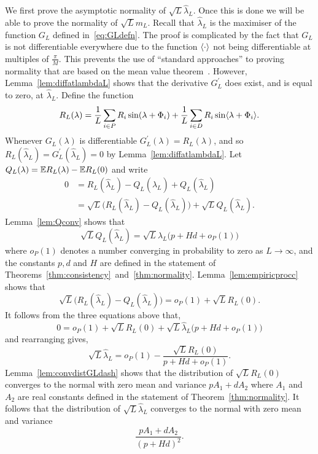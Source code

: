 \documentclass[journal]{IEEEtran}
\begin{document}
We first prove the asymptotic normality of $\sqrt{L} \hat{\lambda}_L$.  Once this is done we will be able to prove the normality of $\sqrt{L} m_L$.  Recall that $\hat{\lambda}_L$ is the maximiser of the function $G_L$ defined in~\eqref{eq:GLdefn}.  The proof is complicated by the fact that $G_L$ is not differentiable everywhere due to the function $\left\langle \cdot \right\rangle$ not being differentiable at multiples of $\tfrac{\pi}{M}$.  This prevents the use of ``standard approaches'' to proving normality that are based on the mean value theorem~\cite{vonMises_diff_stats_1947,vanDerVart1971_asymptotic_stats,Pollard_new_ways_clts_1986,Pollard_conv_stat_proc_1984,Pollard_asymp_empi_proc_1989,van2009empirical}.  However, Lemma~\ref{lem:diffatlambdaL} shows that the derivative $G_L^\prime$ does exist, and is equal to zero, at $\hat{\lambda}_L$. Define the function
\begin{equation}\label{eq:RLdef}
R_L(\lambda) = \frac{1}{L} \sum_{i \in P} R_i \sin(\lambda + \Phi_i) + \frac{1}{L} \sum_{i \in D} R_i \sin\langle \lambda + \Phi_i \rangle.
\end{equation}
Whenever $G_L(\lambda)$ is differentiable $G_L^\prime(\lambda) = R_L(\lambda)$, and so $R_L(\hat{\lambda}_L) = G_L^\prime(\hat{\lambda}_L) = 0$ by Lemma~\ref{lem:diffatlambdaL}.  Let $Q_L(\lambda) = {\mathbb E} R_L(\lambda) - {\mathbb E} R_L(0)$ and write
\begin{align*}
0 &= R_L(\hat{\lambda}_L) - Q_L(\hat{\lambda}_L) + Q_L(\hat{\lambda}_L) \\
&= \sqrt{L}\big( R_L(\hat{\lambda}_L) - Q_L(\hat{\lambda}_L) \big) + \sqrt{L}Q_L(\hat{\lambda}_L).
\end{align*}
Lemma~\ref{lem:Qconv} shows that
\[
\sqrt{L} Q_L(\hat{\lambda}_L) = \sqrt{L} \hat{\lambda}_L\big( p + Hd  + o_P(1) \big)
\]
where $o_P(1)$ denotes a number converging in probability to zero as $L \rightarrow \infty$, and the constants $p,d$ and $H$ are defined in the statement of Theorems~\ref{thm:consistency}~and~\ref{thm:normality}.  Lemma~\ref{lem:empiricprocc} shows that
\[
\sqrt{L}\big( R_L(\hat{\lambda}_L) - Q_L(\hat{\lambda}_L) \big) = o_P(1) + \sqrt{L} R_L(0).
\]
It follows from the three equations above that,
\[
0 = o_P(1) + \sqrt{L}R_L(0) + \sqrt{L} \hat{\lambda}_L \big( p + Hd  + o_P(1) \big)
\]
and rearranging gives,
\[
\sqrt{L} \hat{\lambda}_L = o_P(1) - \frac{\sqrt{L}R_L(0)}{p + Hd  + o_P(1)}.
\]
Lemma~\ref{lem:convdistGLdash} shows that the distribution of $\sqrt{L}R_L(0)$ converges to the normal with zero mean and variance $pA_1 + dA_2$ where $A_1$ and $A_2$ are real constants defined in the statement of Theorem~\ref{thm:normality}.  It follows that the distribution of $\sqrt{L}\hat{\lambda}_L$ converges to the normal with zero mean and variance
\[
\frac{pA_1 + dA_2}{(p + Hd)^2}.
\]
 
\end{document}
